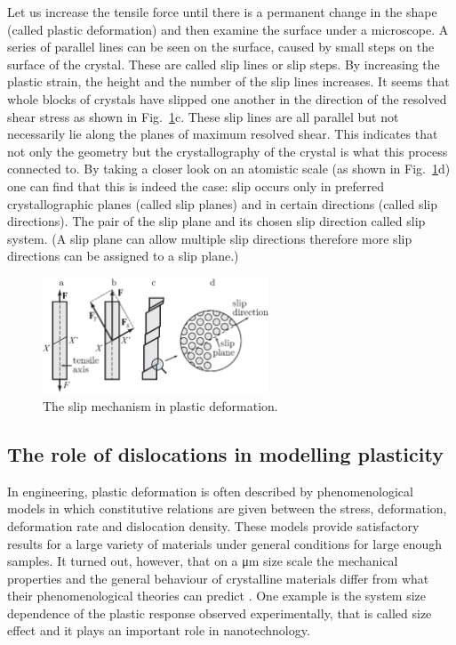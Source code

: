 Let us increase the tensile force until there is a permanent change in the shape (called plastic deformation) and then examine the surface under a microscope. A series of parallel lines can be seen on the surface, caused by small steps on the surface of the crystal. These are called slip lines or slip steps. By increasing the plastic strain, the height and the number of the slip lines increases. It seems that whole blocks of crystals have slipped one another in the direction of the resolved shear stress as shown in Fig.~\ref{fig:plastic_deformation}c. These slip lines are all parallel but not necessarily lie along the planes of maximum resolved shear. This indicates that not only the geometry but the crystallography of the crystal is what this process connected to. By taking a closer look on an atomistic scale (as shown in Fig.~\ref{fig:plastic_deformation}d) one can find that this is indeed the case: slip occurs only in preferred crystallographic planes (called slip planes) and in certain directions (called slip directions). The pair of the slip plane and its chosen slip direction called slip system. (A slip plane can allow multiple slip directions therefore more slip directions can be assigned to a slip plane.)

\begin{figure}[htbp!] 
\centering    
\includegraphics[width=0.6\textwidth]{slip_mechanism}
\caption[Plastic deformation]{The slip mechanism in plastic deformation.}
\label{fig:plastic_deformation}
\end{figure}

\subsection{The role of dislocations in modelling plasticity}
In engineering, plastic deformation is often described by phenomenological models in which constitutive relations are given between the stress, deformation, deformation rate and dislocation density\cite{Taylor1938307,HILL1972401,ASARO1985923,KUBIN1985397}. These models provide satisfactory results for a large variety of materials under general conditions for large enough samples. It turned out, however, that on a \si{\micro\meter} size scale the mechanical properties and the general behaviour of crystalline materials differ from what their phenomenological theories can predict \cite{FLECK1994475,mcelhaney_vlassak_nix_1998,Csikor251}. One example is the system size dependence of the plastic response observed experimentally, that is called size effect and it plays an important role in nanotechnology.

